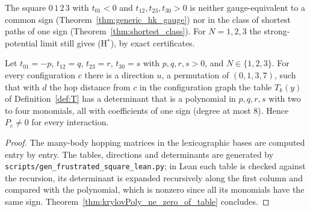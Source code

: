 The square $0\,1\,2\,3$ with $t_{01}<0$ and $t_{12},t_{23},t_{30}>0$ is neither gauge-equivalent to a common
sign (Theorem~\ref{thm:generic_hk_gauge}) nor in the class of shortest paths of one sign
(Theorem~\ref{thm:shortest_class}). For $N=1,2,3$ the strong-potential limit still gives (H$^*$), by exact
certificates.

\begin{lemma}
  \label{lem:frustrated_square_certificates}
  \leanok
  Let $t_{01}=-p$, $t_{12}=q$, $t_{23}=r$, $t_{30}=s$ with $p,q,r,s>0$, and $N\in\{1,2,3\}$. For every
  configuration $c$ there is a direction $u$, a permutation of $(0,1,3,7)$, such that with $d$ the hop distance
  from $c$ in the configuration graph the table $T_k(y)$ of Definition~\ref{def:T} has a determinant that is a
  polynomial in $p,q,r,s$ with two to four monomials, all with coefficients of one sign (degree at most $8$).
  Hence $P_c\neq0$ for every interaction.
\end{lemma}
\begin{proof}
  \leanok
  The many-body hopping matrices in the lexicographic bases are computed entry by entry. The tables, directions
  and determinants are generated by \texttt{scripts/gen\_frustrated\_square\_lean.py}; in Lean each table is
  checked against the recursion, its determinant is expanded recursively along the first column and compared with
  the polynomial, which is nonzero since all its monomials have the same sign.
  Theorem~\ref{thm:krylovPoly_ne_zero_of_table} concludes.
\end{proof}

